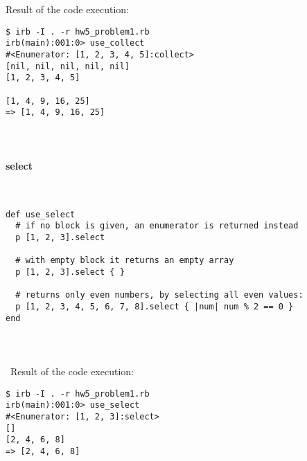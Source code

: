 \documentclass{article}
\begin{document}
\paragraph{}\

Result of the code execution:

\begin{verbatim} 
$ irb -I . -r hw5_problem1.rb
irb(main):001:0> use_collect
#<Enumerator: [1, 2, 3, 4, 5]:collect>
[nil, nil, nil, nil, nil]
[1, 2, 3, 4, 5]

[1, 4, 9, 16, 25]
=> [1, 4, 9, 16, 25]
\end{verbatim}

\paragraph{}\





\paragraph{ select}\

\begin{verbatim}
def use_select
  # if no block is given, an enumerator is returned instead
  p [1, 2, 3].select

  # with empty block it returns an empty array
  p [1, 2, 3].select { }

  # returns only even numbers, by selecting all even values:
  p [1, 2, 3, 4, 5, 6, 7, 8].select { |num| num % 2 == 0 }
end
\end{verbatim}

\paragraph{}\
\paragraph{}\
Result of the code execution:

\begin{verbatim} 
$ irb -I . -r hw5_problem1.rb
irb(main):001:0> use_select
#<Enumerator: [1, 2, 3]:select>
[]
[2, 4, 6, 8]
=> [2, 4, 6, 8]
\end{verbatim}

\paragraph{}\
\end{document}
